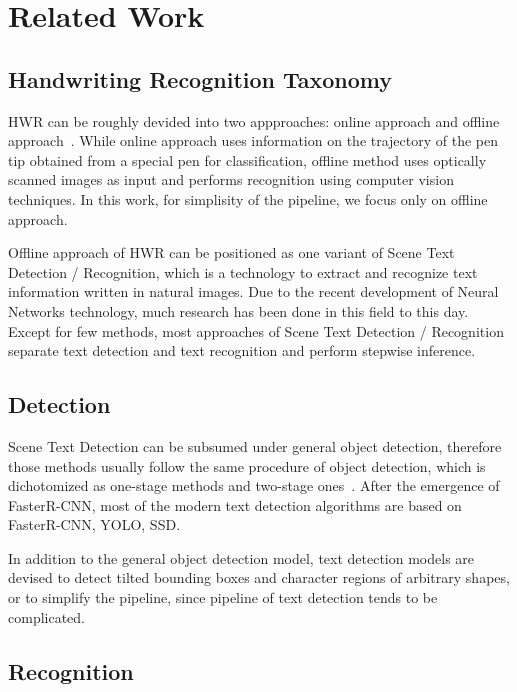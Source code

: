 \section{Related Work}
\label{section:related-work}

\subsection{Handwriting Recognition Taxonomy}

HWR can be roughly devided into two appproaches:
online approach and offline approach~\cite{plamondon2000online}.
While online approach uses information on the trajectory of the pen tip
obtained from a special pen for classification, offline method uses
optically scanned images as input and performs recognition using computer vision techniques.
In this work, for simplisity of the pipeline, we focus only on offline approach.

Offline approach of HWR can be positioned as one variant of Scene Text Detection / Recognition, which
is a technology to extract and recognize text information written in natural images.
Due to the recent development of Neural Networks technology,
much research has been done in this field to this day.
Except for few methods\cite{liu2018fots}\cite{lyu2018mask}, most approaches of Scene Text Detection / Recognition
separate text detection and text recognition and perform stepwise inference.

\subsection{Detection}

Scene Text Detection can be subsumed under general object detection, therefore those methods usually follow
the same procedure of object detection, which is dichotomized as one-stage methods and two-stage ones~\cite{liu2018deep}.
After the emergence of FasterR-CNN\cite{ren2015faster}, most of the modern text detection algorithms
are based on FasterR-CNN, YOLO\cite{redmon2016you}, SSD\cite{liu2016ssd}.

In addition to the general object detection model, text detection models are devised to detect
tilted bounding boxes\cite{zhou2017east}\cite{jiang2017r2cnn} and character regions of arbitrary shapes\cite{zhang2019look},
or to simplify the pipeline\cite{he2017single}, since pipeline of text detection tends to be complicated\cite{liu2018deep}.

\subsection{Recognition}


